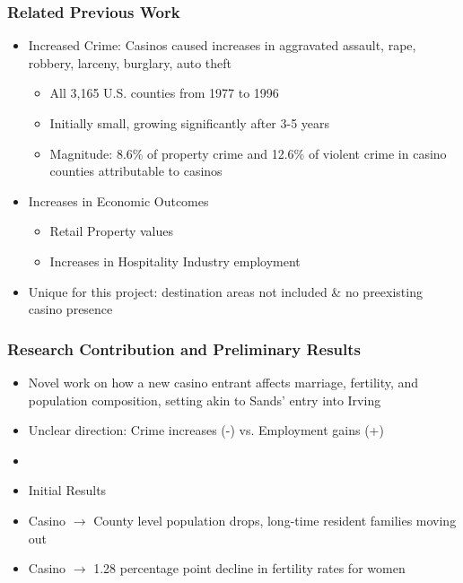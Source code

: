 \documentclass[compress]{beamer}
\let\oldparencite\parencite
\renewcommand{\parencite}[1]{{\mdseries\oldparencite{#1}}}
\begin{document}
\begin{frame} \frametitle{Related Previous Work}
	\begin{itemize}
		\item Increased Crime: Casinos caused increases in aggravated assault, rape, robbery, larceny, burglary, auto theft \parencite{grinols2006casinos}
        \begin{itemize}
        \item All 3,165 U.S. counties from 1977 to 1996
        \item Initially small, growing significantly after 3-5 years
        \item Magnitude: 8.6\% of property crime and 12.6\% of violent crime in casino counties attributable to casinos 
        \end{itemize}
        \item Increases in Economic Outcomes
        \begin{itemize}
            \item Retail Property values \parencite{wiley2011casino} 
            \item Increases in Hospitality Industry employment \parencite{humphreys2013new}
        \end{itemize}
        \item Unique for this project: destination areas not included \& no preexisting casino presence
    \end{itemize}
\end{frame}

\begin{frame} \frametitle{Research Contribution and Preliminary Results}
	\begin{itemize}
		\item Novel work on how a new casino entrant affects marriage, fertility, and population composition, setting akin to Sands' entry into Irving
        \item Unclear direction: Crime increases (-) vs. Employment gains (+)
        \item []
        \item [] Initial Results
        \item Casino $\rightarrow$ County level population drops, long-time resident families moving out
        \item Casino $\rightarrow$ 1.28 percentage point decline in fertility rates for women
    \end{itemize}
\end{frame}
\end{document}
